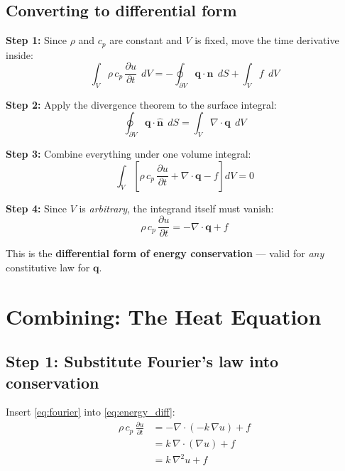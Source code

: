 \documentclass[11pt]{article}
\newcommand{\pd}[2]{\frac{\partial #1}{\partial #2}}
\newcommand{\divergence}{\nabla\!\cdot\!}
\begin{document}
\subsection{Converting to differential form}

\textbf{Step 1:} Since $\rho$ and $c_p$ are constant and $V$ is fixed, move the time derivative inside:
\begin{equation}
  \int_V \rho\, c_p\, \pd{u}{t} \;\, dV
  = -\oint_{\partial V} \mathbf{q} \cdot \hat{\mathbf{n}} \;\, dS
  + \int_V f \;\, dV
\end{equation}

\textbf{Step 2:} Apply the divergence theorem to the surface integral:
\begin{equation}
  \oint_{\partial V} \mathbf{q} \cdot \hat{\mathbf{n}} \;\, dS
  = \int_V \divergence \mathbf{q} \;\, dV
\end{equation}

\textbf{Step 3:} Combine everything under one volume integral:
\begin{equation}
  \int_V \left[\rho\, c_p\, \pd{u}{t} + \divergence \mathbf{q} - f\right] dV = 0
  \label{eq:integral_combined}
\end{equation}

\textbf{Step 4:} Since $V$ is \emph{arbitrary}, the integrand itself must vanish:
\begin{equation}
  \boxed{\rho\, c_p\, \pd{u}{t} = -\divergence \mathbf{q} + f}
  \label{eq:energy_diff}
\end{equation}

This is the \textbf{differential form of energy conservation} --- valid for \emph{any} constitutive law for $\mathbf{q}$.

\section{Combining: The Heat Equation}

\subsection{Step 1: Substitute Fourier's law into conservation}

Insert \eqref{eq:fourier} into \eqref{eq:energy_diff}:
\begin{align}
  \rho\, c_p\, \pd{u}{t} &= -\divergence(-k\,\nabla u) + f \\[6pt]
                          &= k\,\divergence(\nabla u) + f \\[6pt]
                          &= k\,\nabla^2 u + f
\end{align}
\end{document}
